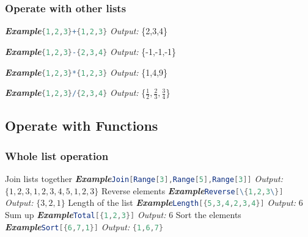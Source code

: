 \documentclass[10pt]{book}
\begin{document}
\subsubsection{Operate with other lists}
\noindent\emph{\textbf{Example}}\quad \lstinline[language=Mathematica]|{1,2,3}+{1,2,3}| \hspace{\fill}\emph{Output:} \{2,3,4\}

\noindent\emph{\textbf{Example}}\quad \lstinline[language=Mathematica]|{1,2,3}-{2,3,4}| \hspace{\fill}\emph{Output:} \{-1,-1,-1\}

\noindent\emph{\textbf{Example}}\quad \lstinline[language=Mathematica]|{1,2,3}*{1,2,3}| \hspace{\fill}\emph{Output:} \{1,4,9\}

\noindent\emph{\textbf{Example}}\quad \lstinline[language=Mathematica]|{1,2,3}/{2,3,4}| \hspace{\fill}\emph{Output:} \{$\frac{1}{2},\frac{2}{3},\frac{3}{4}$\}

\subsection{Operate with Functions}

\subsubsection{Whole list operation}

\noindent Join lists together
\newline
\noindent\emph{\textbf{Example}}\quad \lstinline[language=Mathematica]|Join[Range[3],Range[5],Range[3]]| \hspace{\fill}\emph{Output:} $\{1,2,3,1,2,3,4,5,1,2,3\}$
\newline
\newline
\noindent Reverse elements
\newline
\noindent\emph{\textbf{Example}}\quad \lstinline[language=Mathematica]|Reverse[\{1,2,3\}]| \hspace{\fill}\emph{Output:} $\{3,2,1\}$
\newline
\newline
\noindent Length of the list
\newline
\noindent\emph{\textbf{Example}}\quad \lstinline[language=Mathematica]|Length[{5,3,4,2,3,4}]| \hspace{\fill}\emph{Output:} $6$
\newline
\newline
\noindent Sum up
\newline
\noindent\emph{\textbf{Example}}\quad \lstinline[language=Mathematica]|Total[{1,2,3}]| \hspace{\fill}\emph{Output:} $6$
\newline
\newline
\noindent Sort the elements
\newline
\noindent\emph{\textbf{Example}}\quad \lstinline[language=Mathematica]|Sort[{6,7,1}]| \hspace{\fill}\emph{Output:} \lstinline[language=Mathematica]|{1,6,7}| 
\end{document}

